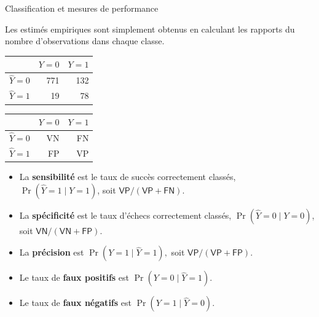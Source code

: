 \documentclass[
  ignorenonframetext,
]{beamer}
\providecommand{\tightlist}{%
  \setlength{\itemsep}{0pt}\setlength{\parskip}{0pt}}\usepackage{longtable,booktabs,array}
\begin{document}
\begin{frame}{Classification et mesures de performance}
\label{classification-et-mesures-de-performance}
\footnotesize

Les estimés empiriques sont simplement obtenus en calculant les rapports
du nombre d'observations dans chaque classe.

\normalsize

\begin{table}

\begin{tabular}{lrr}
\toprule
  & \(Y=0\) & \(Y=1\)\\
\midrule
\(\widehat{Y}=0\) & 771 & 132\\
\(\widehat{Y}=1\) & 19 & 78\\
\bottomrule
\end{tabular}
\begin{tabular}{lrr}
\toprule
  & \(Y=0\) & \(Y=1\)\\
\midrule
\(\widehat{Y}=0\) & VN & FN\\
\(\widehat{Y}=1\) & FP & VP\\
\bottomrule
\end{tabular}
\end{table}

\small

\begin{itemize}
\tightlist
\item
  La \textbf{sensibilité} est le taux de succès correctement classés,
  \(\Pr(\widehat{Y}=1 \mid Y=1)\), soit
  \(\mathsf{VP}/(\mathsf{VP}+\mathsf{FN}).\)
\item
  La \textbf{spécificité} est le taux d'échecs correctement classés,
  \(\Pr(\widehat{Y}=0 \mid Y=0)\), soit
  \(\mathsf{VN}/(\mathsf{VN}+\mathsf{FP}).\)
\item
  La \textbf{précision} est \(\Pr(Y=1 \mid \widehat{Y}=1),\) soit
  \(\mathsf{VP}/(\mathsf{VP} + \mathsf{FP}).\)
\item
  Le taux de \textbf{faux positifs} est \(\Pr(Y=0 \mid \widehat{Y}=1).\)
\item
  Le taux de \textbf{faux négatifs} est \(\Pr(Y=1 \mid \widehat{Y}=0).\)
\end{itemize}

\normalsize
\end{frame}
\end{document}
